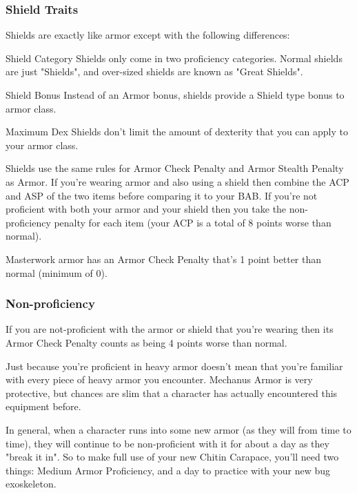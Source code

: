 \subsubsection{Shield Traits}

Shields are exactly like armor except with the following differences:

\begin{description*}
\item[Shield Category] Shields only come in two proficiency categories. Normal shields are just "Shields", and over-sized shields are known as "Great Shields".

\item[Shield Bonus] Instead of an Armor bonus, shields provide a Shield type bonus to armor class.

\item[Maximum Dex] Shields don't limit the amount of dexterity that you can apply to your armor class.
\end{description*}

Shields use the same rules for Armor Check Penalty and Armor Stealth Penalty as Armor. If you're wearing armor and also using a shield then combine the ACP and ASP of the two items before comparing it to your BAB. If you're not proficient with both your armor and your shield then you take the non-proficiency penalty for each item (your ACP is a total of 8 points worse than normal).

Masterwork armor has an Armor Check Penalty that's 1 point better than normal (minimum of 0).

\subsubsection{Non-proficiency}

If you are not-proficient with the armor or shield that you're wearing then its Armor Check Penalty counts as being 4 points worse than normal.

Just because you're proficient in heavy armor doesn't mean that you're familiar with every piece of heavy armor you encounter. Mechanus Armor is very protective, but chances are slim that a character has actually encountered this equipment before.

In general, when a character runs into some new armor (as they will from time to time), they will continue to be non-proficient with it for about a day as they "break it in". So to make full use of your new Chitin Carapace, you'll need two things: Medium Armor Proficiency, and a day to practice with your new bug exoskeleton.

